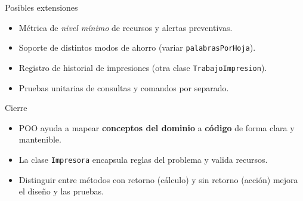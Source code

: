 \documentclass[aspectratio=169]{beamer}
\begin{document}
\begin{frame}{Posibles extensiones}
  \begin{itemize}
    \item Métrica de \textit{nivel mínimo} de recursos y alertas preventivas.
    \item Soporte de distintos modos de ahorro (variar \texttt{palabrasPorHoja}).
    \item Registro de historial de impresiones (otra clase \texttt{TrabajoImpresion}).
    \item Pruebas unitarias de consultas y comandos por separado.
  \end{itemize}
\end{frame}

\begin{frame}{Cierre}
  \begin{itemize}
    \item POO ayuda a mapear \textbf{conceptos del dominio} a \textbf{código} de forma clara y mantenible.
    \item La clase \texttt{Impresora} encapsula reglas del problema y valida recursos.
    \item Distinguir entre métodos con retorno (cálculo) y sin retorno (acción) mejora el diseño y las pruebas.
  \end{itemize}
\end{frame}
\end{document}

